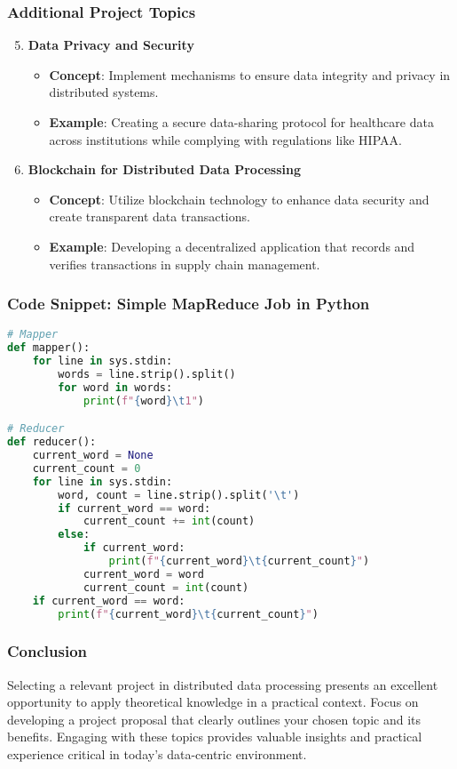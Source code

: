 \documentclass[aspectratio=169]{beamer}
\begin{document}
\begin{frame}
    \frametitle{Additional Project Topics}
    \begin{enumerate}
        \setcounter{enumi}{4}
        \item \textbf{Data Privacy and Security}
            \begin{itemize}
                \item \textbf{Concept}: Implement mechanisms to ensure data integrity and privacy in distributed systems.
                \item \textbf{Example}: Creating a secure data-sharing protocol for healthcare data across institutions while complying with regulations like HIPAA.
            \end{itemize}
        \item \textbf{Blockchain for Distributed Data Processing}
            \begin{itemize}
                \item \textbf{Concept}: Utilize blockchain technology to enhance data security and create transparent data transactions.
                \item \textbf{Example}: Developing a decentralized application that records and verifies transactions in supply chain management.
            \end{itemize}
    \end{enumerate}
\end{frame}

\begin{frame}[fragile]
    \frametitle{Code Snippet: Simple MapReduce Job in Python}
    \begin{lstlisting}[language=Python]
# Mapper
def mapper():
    for line in sys.stdin:
        words = line.strip().split()
        for word in words:
            print(f"{word}\t1")

# Reducer
def reducer():
    current_word = None
    current_count = 0
    for line in sys.stdin:
        word, count = line.strip().split('\t')
        if current_word == word:
            current_count += int(count)
        else:
            if current_word:
                print(f"{current_word}\t{current_count}")
            current_word = word
            current_count = int(count)
    if current_word == word:
        print(f"{current_word}\t{current_count}")
    \end{lstlisting}
\end{frame}

\begin{frame}
    \frametitle{Conclusion}
    Selecting a relevant project in distributed data processing presents an excellent opportunity to apply theoretical knowledge in a practical context. Focus on developing a project proposal that clearly outlines your chosen topic and its benefits. Engaging with these topics provides valuable insights and practical experience critical in today's data-centric environment.
\end{frame}
\end{document}
